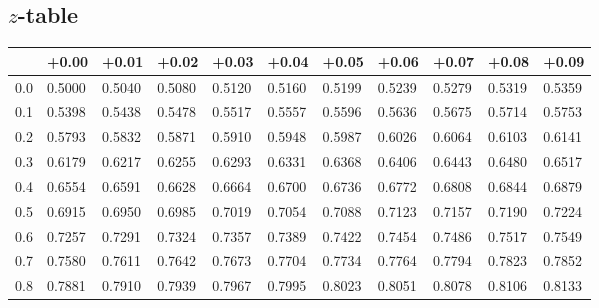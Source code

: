 \documentclass{article}
\begin{document}
\begin{center}
\section*{$z$-table}
%
\begin{tabular}{lllllllllll}
\toprule
 & +0.00 & +0.01 & +0.02 & +0.03 & +0.04 & +0.05 & +0.06 & +0.07 & +0.08 & +0.09 \\
\midrule
0.0 & \cellcolor{gray!20}0.5000 & \cellcolor{gray!20}0.5040 & \cellcolor{gray!20}0.5080 & \cellcolor{gray!20}0.5120 & \cellcolor{gray!20}0.5160 & \cellcolor{gray!20}0.5199 & \cellcolor{gray!20}0.5239 & \cellcolor{gray!20}0.5279 & \cellcolor{gray!20}0.5319 & \cellcolor{gray!20}0.5359 \\
0.1 & 0.5398 & 0.5438 & 0.5478 & 0.5517 & 0.5557 & 0.5596 & 0.5636 & 0.5675 & 0.5714 & 0.5753 \\
0.2 & \cellcolor{gray!20}0.5793 & \cellcolor{gray!20}0.5832 & \cellcolor{gray!20}0.5871 & \cellcolor{gray!20}0.5910 & \cellcolor{gray!20}0.5948 & \cellcolor{gray!20}0.5987 & \cellcolor{gray!20}0.6026 & \cellcolor{gray!20}0.6064 & \cellcolor{gray!20}0.6103 & \cellcolor{gray!20}0.6141 \\
0.3 & 0.6179 & 0.6217 & 0.6255 & 0.6293 & 0.6331 & 0.6368 & 0.6406 & 0.6443 & 0.6480 & 0.6517 \\
0.4 & \cellcolor{gray!20}0.6554 & \cellcolor{gray!20}0.6591 & \cellcolor{gray!20}0.6628 & \cellcolor{gray!20}0.6664 & \cellcolor{gray!20}0.6700 & \cellcolor{gray!20}0.6736 & \cellcolor{gray!20}0.6772 & \cellcolor{gray!20}0.6808 & \cellcolor{gray!20}0.6844 & \cellcolor{gray!20}0.6879 \\
0.5 & 0.6915 & 0.6950 & 0.6985 & 0.7019 & 0.7054 & 0.7088 & 0.7123 & 0.7157 & 0.7190 & 0.7224 \\
0.6 & \cellcolor{gray!20}0.7257 & \cellcolor{gray!20}0.7291 & \cellcolor{gray!20}0.7324 & \cellcolor{gray!20}0.7357 & \cellcolor{gray!20}0.7389 & \cellcolor{gray!20}0.7422 & \cellcolor{gray!20}0.7454 & \cellcolor{gray!20}0.7486 & \cellcolor{gray!20}0.7517 & \cellcolor{gray!20}0.7549 \\
0.7 & 0.7580 & 0.7611 & 0.7642 & 0.7673 & 0.7704 & 0.7734 & 0.7764 & 0.7794 & 0.7823 & 0.7852 \\
0.8 & \cellcolor{gray!20}0.7881 & \cellcolor{gray!20}0.7910 & \cellcolor{gray!20}0.7939 & \cellcolor{gray!20}0.7967 & \cellcolor{gray!20}0.7995 & \cellcolor{gray!20}0.8023 & \cellcolor{gray!20}0.8051 & \cellcolor{gray!20}0.8078 & \cellcolor{gray!20}0.8106 & \cellcolor{gray!20}0.8133 \\

\end{tabular}
\end{center}
\end{document}
